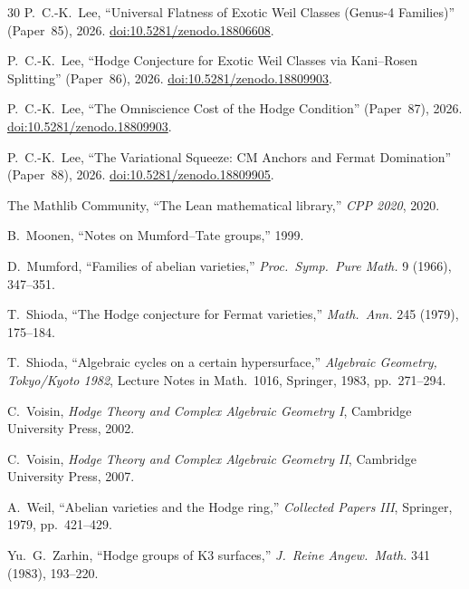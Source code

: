 \documentclass[11pt,a4paper]{article}
\theoremstyle{definition}
\theoremstyle{remark}
\begin{document}
\begin{thebibliography}{30}
P.~C.-K.~Lee,
``Universal Flatness of Exotic Weil Classes (Genus-4 Families)'' (Paper~85),
2026.
\href{https://doi.org/10.5281/zenodo.18806608}{doi:10.5281/zenodo.18806608}.

P.~C.-K.~Lee,
``Hodge Conjecture for Exotic Weil Classes via Kani--Rosen Splitting'' (Paper~86),
2026.
\href{https://doi.org/10.5281/zenodo.18809903}{doi:10.5281/zenodo.18809903}.

P.~C.-K.~Lee,
``The Omniscience Cost of the Hodge Condition'' (Paper~87),
2026.
\href{https://doi.org/10.5281/zenodo.18809903}{doi:10.5281/zenodo.18809903}.

P.~C.-K.~Lee,
``The Variational Squeeze: CM Anchors and Fermat Domination'' (Paper~88),
2026.
\href{https://doi.org/10.5281/zenodo.18809905}{doi:10.5281/zenodo.18809905}.

The Mathlib Community,
``The Lean mathematical library,''
\emph{CPP 2020}, 2020.

B.~Moonen,
``Notes on Mumford--Tate groups,'' 1999.

D.~Mumford,
``Families of abelian varieties,''
\emph{Proc.\ Symp.\ Pure Math.} 9 (1966), 347--351.

T.~Shioda,
``The Hodge conjecture for Fermat varieties,''
\emph{Math.\ Ann.} 245 (1979), 175--184.

T.~Shioda,
``Algebraic cycles on a certain hypersurface,''
\emph{Algebraic Geometry, Tokyo/Kyoto 1982},
Lecture Notes in Math.\ 1016, Springer, 1983, pp.\ 271--294.

C.~Voisin,
\emph{Hodge Theory and Complex Algebraic Geometry I},
Cambridge University Press, 2002.

C.~Voisin,
\emph{Hodge Theory and Complex Algebraic Geometry II},
Cambridge University Press, 2007.

A.~Weil,
``Abelian varieties and the Hodge ring,''
\emph{Collected Papers III}, Springer, 1979, pp.\ 421--429.

Yu.~G.~Zarhin,
``Hodge groups of K3 surfaces,''
\emph{J.\ Reine Angew.\ Math.} 341 (1983), 193--220.

\end{thebibliography}
\end{document}
